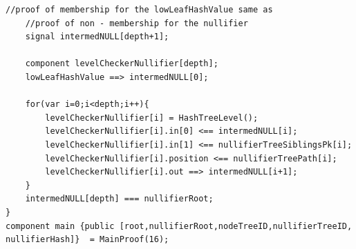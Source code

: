 \documentclass[12pt, letterpaper]{article}
\begin{document}
\begin{lstlisting}[caption="MainProof.circom"]
    //proof of membership for the lowLeafHashValue same as 
    //proof of non - membership for the nullifier
    signal intermedNULL[depth+1];

    component levelCheckerNullifier[depth];
    lowLeafHashValue ==> intermedNULL[0];

    for(var i=0;i<depth;i++){
        levelCheckerNullifier[i] = HashTreeLevel();
        levelCheckerNullifier[i].in[0] <== intermedNULL[i];
        levelCheckerNullifier[i].in[1] <== nullifierTreeSiblingsPk[i];
        levelCheckerNullifier[i].position <== nullifierTreePath[i];
        levelCheckerNullifier[i].out ==> intermedNULL[i+1];
    }
    intermedNULL[depth] === nullifierRoot;    
}
component main {public [root,nullifierRoot,nodeTreeID,nullifierTreeID,
nullifierHash]}  = MainProof(16);
\end{lstlisting}
\printbibliography
\end{document}
